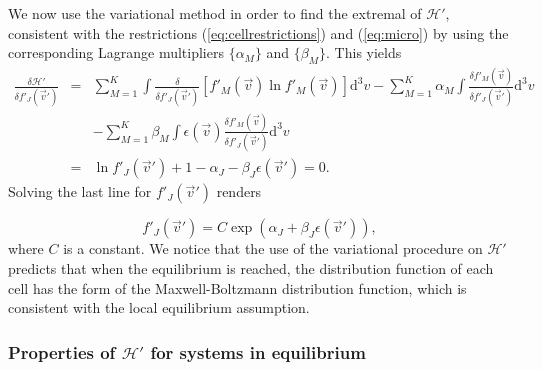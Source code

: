 We now use the variational method in order to find the extremal of $\mathcal{H}'$, consistent with the restrictions
(\ref{eq:cellrestrictions}) and (\ref{eq:micro}) by using the corresponding Lagrange
multipliers $\{\alpha_M\}$ and $\{\beta_M\}$. This yields
%
\begin{eqnarray}\label{eq:deltaHpdeltafpj}
    \frac{\delta \mathcal{H}'}{\delta f'_J(\vec{v}')} & = & \sum_{M=1}^{K}\int
      \frac{\delta}{\delta f'_J(\vec{v}')}\left[
        f'_M(\vec{v})\ln f'_M(\vec{v})
        \right]
       \mathrm{d}^3v -\sum_{M=1}^{K}\alpha_M\int
       	\frac{\delta f'_M(\vec{v})}{\delta f'_J(\vec{v}')}
      \mathrm{d}^3v\nonumber\\
    & & -\sum_{M=1}^{K}\beta_M\int\epsilon(\vec{v})
    	\frac{\delta f'_M(\vec{v})}{\delta f'_J(\vec{v}')}
      \mathrm{d}^3v \nonumber\\
    & = & \ln f'_J(\vec{v}')+1-\alpha_J-\beta_J \epsilon(\vec{v}')=0.
\end{eqnarray}
%
Solving the last line for $f'_J(\vec{v}')$ renders
%
\begin{comment}
\begin{eqnarray}
    \ln f'_J(\vec{v}') & = & \alpha_J+\beta_J \epsilon(\vec{v}')
       -1\quad\Rightarrow\quad f_J(\vec{v}')\\
    & = & e^{\alpha_J +\beta_J \epsilon(\vec{v}')-1}\nonumber\\
    & = & Ce^{\alpha_J+\beta_J \epsilon(\vec{v}') } \label{eq:relacion1},
\end{eqnarray}
\end{comment}
\begin{equation}\label{eq:relacion1}
	f'_J(\vec{v}') = C\exp\left({\alpha_J+\beta_J \epsilon(\vec{v}') }\right),
\end{equation}
%
where $C$ is a constant. We notice that the use of the variational procedure on
$\mathcal{H}'$ predicts that when the equilibrium is reached, the
distribution function of each cell has the form of the Maxwell-Boltzmann
distribution function, which is consistent with the local equilibrium assumption.

\subsubsection{Properties of $\mathcal{H}'$ for systems in equilibrium}

